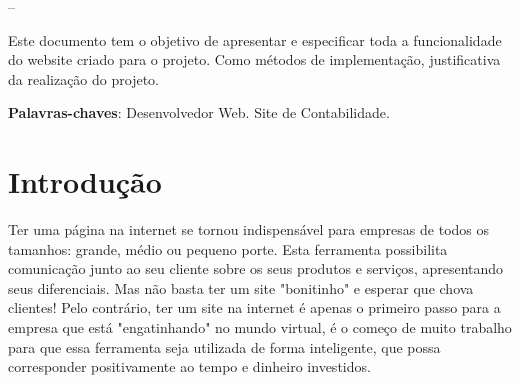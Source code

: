 \documentclass[
	12pt,				%
    oneside,			%
	a4paper,			%
	english,			%
	french,				%
	spanish,			%
	brazil,				%
	]{abntex2}
\begin{document}
\frenchspacing 


\imprimircapa

--

\begin{resumo} %
 Este documento tem o objetivo de apresentar e especificar toda a funcionalidade do website criado para o projeto. Como métodos de implementação, justificativa da realização do projeto.

 \vspace{\onelineskip}
    
 \noindent
 \textbf{Palavras-chaves}: Desenvolvedor Web. Site de Contabilidade.
\end{resumo} %





\tableofcontents*


\textual


\chapter{Introdução} %



Ter uma página na internet se tornou indispensável para empresas de todos os tamanhos: grande, médio ou pequeno porte. Esta ferramenta possibilita comunicação junto ao seu cliente sobre os seus produtos e serviços, apresentando seus diferenciais. Mas não basta ter um site "bonitinho" e esperar que chova clientes! Pelo contrário, ter um site na internet é apenas o primeiro passo para a empresa que está "engatinhando" no mundo virtual, é o começo de muito trabalho para que essa ferramenta seja utilizada de forma inteligente, que possa corresponder positivamente ao tempo e dinheiro investidos.
\end{document}
